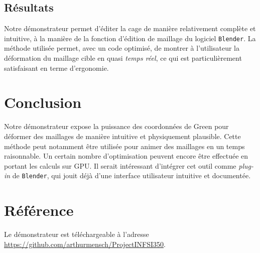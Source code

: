 \documentclass[10pt,a4paper]{article}
\begin{document}
\subsection{Résultats}

Notre démonstrateur permet d'éditer la cage de manière relativement complète et intuitive, à la manière de la fonction d'édition de maillage du logiciel \texttt{Blender}. La méthode utilisée permet, avec un code optimisé, de montrer à l'utilisateur la déformation du maillage cible en quasi \emph{temps réel}, ce qui est particulièrement satisfaisant en terme d'ergonomie.

\section*{Conclusion}

Notre démonstrateur expose la puissance des coordonnées de Green pour déformer des maillages de manière intuitive et physiquement plausible. Cette méthode peut notamment être utilisée pour animer des maillages en un temps raisonnable. Un certain nombre d'optimisation peuvent encore être effectuée en portant les calculs sur GPU. Il serait intéressant d'intégrer cet outil comme \textit{plug-in} de \texttt{Blender}, qui jouit déjà d'une interface utilisateur intuitive et documentée.

\section*{Référence}

Le démonstrateur est téléchargeable à l'adresse \url{https://github.com/arthurmensch/ProjectINFSI350}.




\end{document}
